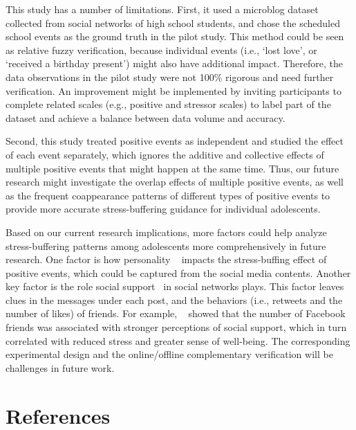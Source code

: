\documentclass[5p,times,numbers,authoryear]{elsarticle}
\begin{document}
This study has a number of limitations.
First, it used a microblog dataset collected from social networks of high school students,
and chose the scheduled school events as the ground truth in the pilot study.
This method could be seen as relative fuzzy verification,
because individual events (i.e., `lost love', or `received a birthday present') might also have additional impact.
Therefore, the data observations in the pilot study were not 100\% rigorous and need further verification.
An improvement might be implemented by inviting participants to complete related scales (e.g., positive and stressor scales) to label part of the dataset and achieve a balance between data volume and accuracy.

Second, this study treated positive events as independent and studied the effect of each event separately, which ignores the additive and collective effects of multiple positive events that might happen at the same time.
Thus, our future research might investigate the overlap effects of multiple positive events,
as well as the frequent coappearance patterns of different types of positive events to provide more accurate stress-buffering guidance for individual adolescents.

Based on our current research implications, more factors could help analyze stress-buffering patterns among adolescents more comprehensively in future research.
One factor is how personality ~\citep{personality1,personality2} impacts the stress-buffing effect of positive events, 
which could be captured from the social media contents.
Another key factor is the role social support~\citep{socialSupport1, socialSupport2} in social networks plays.
This factor leaves clues in the messages under each post,
and the behaviors (i.e., retweets and the number of likes) of friends.
For example, ~\citep{socialSupport1} showed that the number of Facebook friends was associated with stronger perceptions of social support,
which in turn correlated with reduced stress and greater sense of well-being.
The corresponding experimental design and the online/offline complementary verification will be challenges in future work.


\section{References}
%
%
\end{document}
